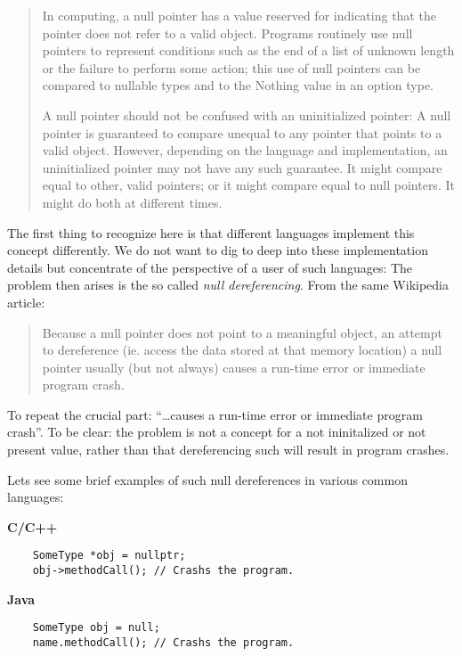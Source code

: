 \documentclass[a4paper,12pt]{article}
\begin{document}
\begin{quotation}
    In computing, a null pointer has a value reserved for indicating that the pointer does not refer to a valid object. Programs routinely use null pointers to represent conditions such as the end of a list of unknown length or the failure to perform some action; this use of null pointers can be compared to nullable types and to the Nothing value in an option type.

    A null pointer should not be confused with an uninitialized pointer: A null pointer is guaranteed to compare unequal to any pointer that points to a valid object. However, depending on the language and implementation, an uninitialized pointer may not have any such guarantee. It might compare equal to other, valid pointers; or it might compare equal to null pointers. It might do both at different times.
\end{quotation}

The first thing to recognize here is that different languages implement this concept differently. We do not want to dig to deep into these implementation details but concentrate of the perspective of a user of such languages: The problem then arises is the so called \textit{null dereferencing}. From the same Wikipedia\cite{null-wiki} article:

\begin{quotation}
    Because a null pointer does not point to a meaningful object, an attempt to dereference (ie. access the data stored at that memory location) a null pointer usually (but not always) causes a run-time error or immediate program crash.
\end{quotation}

To repeat the crucial part: ``\ldots causes a run-time error or immediate program crash''. To be clear: the problem is not a concept for a not ininitalized or not present value, rather than that dereferencing such will result in program crashes.

Lets see some brief examples of such null dereferences in various common languages:

\textbf{C/C++}
\begin{verbatim}
    SomeType *obj = nullptr;
    obj->methodCall(); // Crashs the program.
\end{verbatim}

\textbf{Java}
\begin{verbatim}
    SomeType obj = null;
    name.methodCall(); // Crashs the program.
\end{verbatim}
\end{document}
